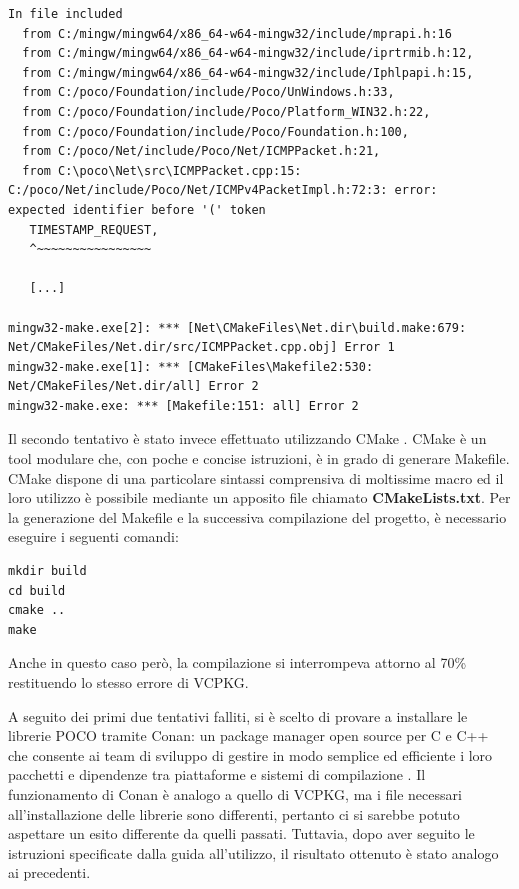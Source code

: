 \begin{verbatim}
In file included 
  from C:/mingw/mingw64/x86_64-w64-mingw32/include/mprapi.h:16       
  from C:/mingw/mingw64/x86_64-w64-mingw32/include/iprtrmib.h:12,
  from C:/mingw/mingw64/x86_64-w64-mingw32/include/Iphlpapi.h:15,
  from C:/poco/Foundation/include/Poco/UnWindows.h:33,
  from C:/poco/Foundation/include/Poco/Platform_WIN32.h:22,
  from C:/poco/Foundation/include/Poco/Foundation.h:100,
  from C:/poco/Net/include/Poco/Net/ICMPPacket.h:21,
  from C:\poco\Net\src\ICMPPacket.cpp:15:
C:/poco/Net/include/Poco/Net/ICMPv4PacketImpl.h:72:3: error: 
expected identifier before '(' token
   TIMESTAMP_REQUEST,
   ^~~~~~~~~~~~~~~~~
   
   [...]
   
mingw32-make.exe[2]: *** [Net\CMakeFiles\Net.dir\build.make:679:
Net/CMakeFiles/Net.dir/src/ICMPPacket.cpp.obj] Error 1
mingw32-make.exe[1]: *** [CMakeFiles\Makefile2:530: 
Net/CMakeFiles/Net.dir/all] Error 2
mingw32-make.exe: *** [Makefile:151: all] Error 2
\end{verbatim}

Il secondo tentativo è stato invece effettuato utilizzando CMake \cite{CMake}. CMake è un tool modulare che, con poche e concise istruzioni, è in grado di generare Makefile. CMake dispone di una particolare sintassi comprensiva di moltissime macro ed il loro utilizzo è possibile mediante un apposito file chiamato  \textbf{CMakeLists.txt}. Per la generazione del Makefile e la successiva compilazione del progetto, è necessario eseguire i seguenti comandi:

\begin{verbatim}
mkdir build
cd build
cmake ..
make
\end{verbatim}

Anche in questo caso però, la compilazione si interrompeva attorno al 70\% restituendo lo stesso errore di VCPKG.

A seguito dei primi due tentativi falliti, si è scelto di provare a installare le librerie POCO tramite Conan: un package manager open source per C e C++ che consente ai team di sviluppo di gestire in modo semplice ed efficiente i loro pacchetti e dipendenze tra piattaforme e sistemi di compilazione \cite{Conan}. Il funzionamento di Conan è analogo a quello di VCPKG, ma i file necessari all'installazione delle librerie sono differenti, pertanto ci si sarebbe potuto aspettare un esito differente da quelli passati. Tuttavia, dopo aver seguito le istruzioni specificate dalla guida all'utilizzo, il risultato ottenuto è stato analogo ai precedenti.
